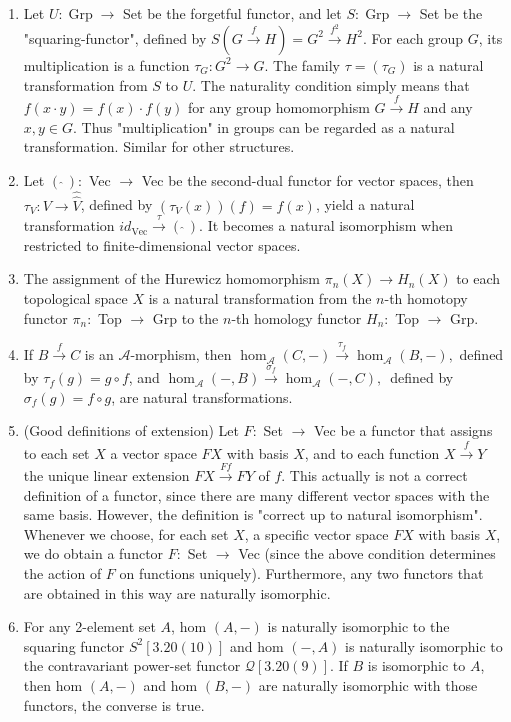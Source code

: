 \begin{example}
    \begin{enumerate}
        \item Let $U: \operatorname{Grp} \rightarrow$ Set be the forgetful functor, and let $S: \operatorname{Grp} \rightarrow$ Set be the "squaring-functor", defined by $S(G \xrightarrow{f} H)=G^2 \xrightarrow{f^2} H^2$. For each group $G$, its multiplication is a function $\tau_G: G^2 \rightarrow G$. The family $\tau=\left(\tau_G\right)$ is a natural transformation from $S$ to $U$. The naturality condition simply means that $f(x \cdot y)=f(x) \cdot f(y)$ for any group homomorphism $G \xrightarrow{f} H$ and any $x, y \in G$. Thus "multiplication" in groups can be regarded as a natural transformation. Similar for other structures.
        \item Let $(\,\hat{} \,):$ Vec $\rightarrow$ Vec be the second-dual functor for vector spaces, then $\tau_V: V \rightarrow \hat{\hat{V}}$, defined by $\left(\tau_V(x)\right)(f)=f(x)$, yield a natural transformation $i d{ }_{\mathrm{Vec}} \xrightarrow{\tau}(\,\hat{}\,)$. It becomes a natural isomorphism when restricted to finite-dimensional vector spaces.
        \item The assignment of the Hurewicz homomorphism $\pi_n(X) \rightarrow H_n(X)$ to each topological space $X$ is a natural transformation from the $n$-th homotopy functor $\pi_n:$ Top $\rightarrow$ Grp to the $n$-th homology functor $H_n:$ Top $\rightarrow$ Grp.
        \item If $B \xrightarrow{f} C$ is an $\mathcal{A}$-morphism, then
        $
        \operatorname{hom}_{\mathcal{A}}(C,-) \xrightarrow{\tau_f} \operatorname{hom}_{\mathcal{A}}(B,-),
        $
        defined by $\tau_f(g)=g \circ f$, and
        $
        \operatorname{hom}_{\mathcal{A}}(-, B) \xrightarrow{\sigma_f} \operatorname{hom}_{\mathcal{A}}(-, C) \text {, }
        $
        defined by $\sigma_f(g)=f \circ g$, are natural transformations.
        \item (Good definitions of extension) Let $F:$ Set $\rightarrow$ Vec be a functor that assigns to each set $X$ a vector space $F X$ with basis $X$, and to each function $X \xrightarrow{f} Y$ the unique linear extension $F X \xrightarrow{F f} F Y$ of $f$. This actually is not a correct definition of a functor, since there are many different vector spaces with the same basis. However, the definition is "correct up to natural isomorphism". Whenever we choose, for each set $X$, a specific vector space $F X$ with basis $X$, we do obtain a functor $F:$ Set $\rightarrow$ Vec (since the above condition determines the action of $F$ on functions uniquely). Furthermore, any two functors that are obtained in this way are naturally isomorphic.
        \item For any 2-element set $A$, hom $(A,-)$ is naturally isomorphic to the squaring functor $S^2[3.20(10)]$ and hom $(-, A)$ is naturally isomorphic to the contravariant power-set functor $\mathcal{Q}[3.20(9)]$. If $B$ is isomorphic to $A$, then hom $(A,-)$ and hom $(B,-)$ are naturally isomorphic with those functors, the converse is true.
    \end{enumerate}
\end{example}
